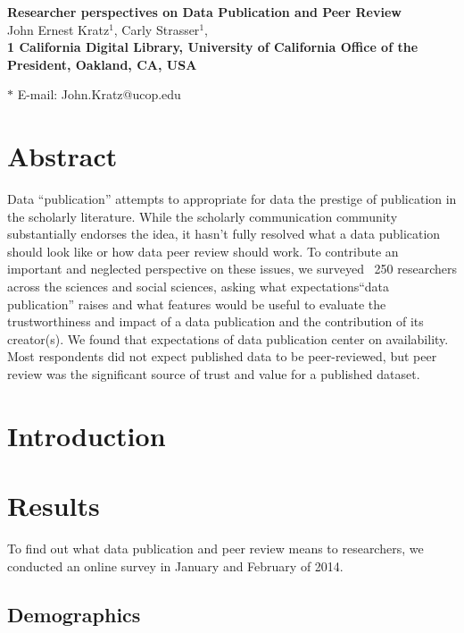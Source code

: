 \documentclass[10pt]{article}
\date{}
\begin{document}
\begin{flushleft}
{\Large
\textbf{Researcher perspectives on Data Publication and Peer Review}
}
\\
John Ernest Kratz$^{1}$, 
Carly Strasser$^{1}$, 
\\
\bf{1} California Digital Library, University of California Office of the President, Oakland, CA, USA

$\ast$ E-mail: John.Kratz@ucop.edu
\end{flushleft}

\section*{Abstract}

Data ``publication'' attempts to appropriate for data the prestige of publication in the scholarly literature. 
While the scholarly communication community substantially endorses the idea, it hasn't fully resolved what a data publication should look like or how data peer review should work. 
To contribute an important and neglected perspective on these issues, we surveyed ~250 researchers across the sciences and social sciences, asking what expectations``data publication'' raises and what features would be useful to evaluate the trustworthiness and impact of a data publication and the contribution of its creator(s).  
We found that expectations of data publication center on availability.
Most respondents did not expect published data to be peer-reviewed, but peer review was the significant source of trust and value for a published dataset.



\section*{Introduction}

\section*{Results}
To find out what data publication and peer review means to researchers, we conducted an online survey in January and February of 2014.

\subsection*{Demographics}
\end{document}
